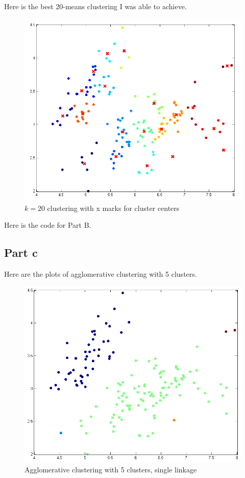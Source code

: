 \documentclass[twoside,11pt]{article}
\theoremstyle{definition}
\begin{document}
\newpage

Here is the best 20-means clustering I was able to achieve.
\begin{figure}[h]
\centering
\includegraphics[width=6 in]{prob1PartB_2.png}
\caption{$k=20$ clustering with x marks for cluster centers}
\end{figure}

\newpage

Here is the code for Part B.


\newpage

\subsection*{Part c}

Here are the plots of agglomerative clustering with 5 clusters.  
\begin{figure}[h]
\centering
\includegraphics[width=6 in]{prob1PartC_1.png}
\caption{Agglomerative clustering with 5 clusters, single linkage}
\end{figure}
\end{document}

